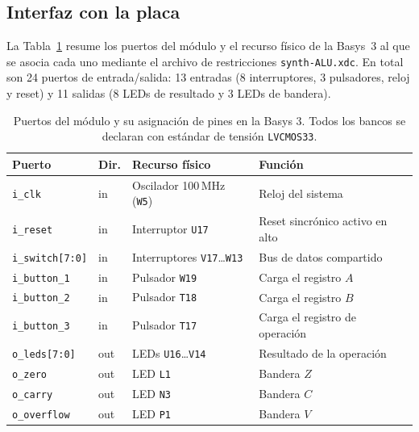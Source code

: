 \documentclass[12pt,a4paper]{article}
\begin{document}
\subsection{Interfaz con la placa}

La Tabla~\ref{tab:io} resume los puertos del módulo y el recurso físico de la Basys~3 al
que se asocia cada uno mediante el archivo de restricciones \texttt{synth-ALU.xdc}. En
total son 24 puertos de entrada/salida: 13 entradas (8 interruptores, 3 pulsadores, reloj y
reset) y 11 salidas (8 LEDs de resultado y 3 LEDs de bandera).

\begin{table}[H]
  \centering
  \small
  \begin{tabular}{llll}
    \toprule
    \textbf{Puerto} & \textbf{Dir.} & \textbf{Recurso físico} & \textbf{Función} \\
    \midrule
    \texttt{i\_clk}        & in  & Oscilador 100\,MHz (\texttt{W5})  & Reloj del sistema \\
    \texttt{i\_reset}      & in  & Interruptor \texttt{U17}                & Reset sincrónico activo en alto \\
    \texttt{i\_switch[7:0]}& in  & Interruptores \texttt{V17}\dots\texttt{W13} & Bus de datos compartido \\
    \texttt{i\_button\_1}  & in  & Pulsador \texttt{W19}                   & Carga el registro $A$ \\
    \texttt{i\_button\_2}  & in  & Pulsador \texttt{T18}                   & Carga el registro $B$ \\
    \texttt{i\_button\_3}  & in  & Pulsador \texttt{T17}                   & Carga el registro de operación \\
    \midrule
    \texttt{o\_leds[7:0]}  & out & LEDs \texttt{U16}\dots\texttt{V14}      & Resultado de la operación \\
    \texttt{o\_zero}       & out & LED \texttt{L1}                         & Bandera $Z$ \\
    \texttt{o\_carry}      & out & LED \texttt{N3}                         & Bandera $C$ \\
    \texttt{o\_overflow}   & out & LED \texttt{P1}                         & Bandera $V$ \\
    \bottomrule
  \end{tabular}
  \caption{Puertos del módulo y su asignación de pines en la Basys 3. Todos los bancos se
           declaran con estándar de tensión \texttt{LVCMOS33}.}
  \label{tab:io}
\end{table}
\end{document}
